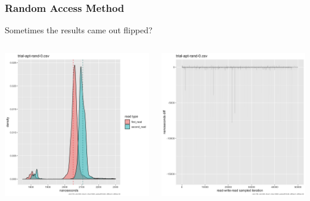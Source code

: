 \documentclass{beamer}
\begin{document}
\begin{frame}
 \frametitle{Random Access Method}
 Sometimes the results came out flipped?
 \begin{columns}
  \begin{column}{0.5\textwidth}
   \includegraphics[width=\linewidth]{trial-apt-rand-0-histogram.png}

  \end{column}
  \begin{column}{0.5\textwidth}
   \includegraphics[width=\linewidth]{trial-apt-rand-0-barchart.png}

  \end{column}

 \end{columns}
\end{frame}
\end{document}
